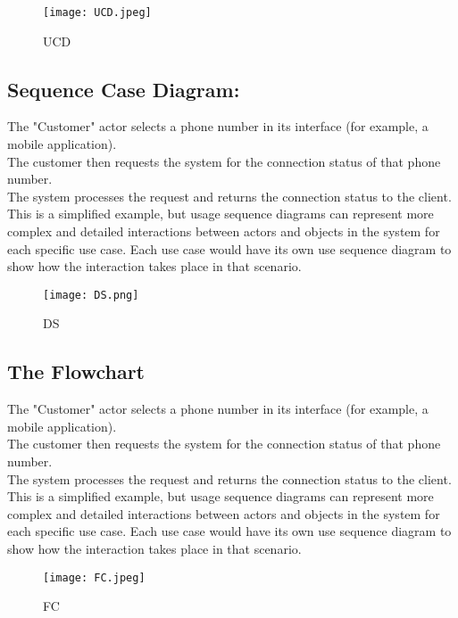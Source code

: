 \documentclass[journal]{IEEEtran}
\begin{document}
\begin{figure}[h]
    \centering
 \texttt{[image: UCD.jpeg]}
    \caption{UCD}
    \label{fig:ejemplo}
\end{figure}

\subsection{Sequence Case Diagram:}
The "Customer" actor selects a phone number in its interface (for example, a mobile application).\\
The customer then requests the system for the connection status of that phone number. \\
The system processes the request and returns the connection status to the client. \\
This is a simplified example, but usage sequence diagrams can represent more complex and detailed interactions between actors and objects in the system for each specific use case. Each use case would have its own use sequence diagram to show how the interaction takes place in that scenario.

\begin{figure}[h]
    \centering
 \texttt{[image: DS.png]}
    \caption{DS}
    \label{fig:ejemplo}
\end{figure}

\subsection{The Flowchart}
The "Customer" actor selects a phone number in its interface (for example, a mobile application). \\
The customer then requests the system for the connection status of that phone number. \\
The system processes the request and returns the connection status to the client. \\
This is a simplified example, but usage sequence diagrams can represent more complex and detailed interactions between actors and objects in the system for each specific use case. Each use case would have its own use sequence diagram to show how the interaction takes place in that scenario.

\begin{figure}[h]
    \centering
 \texttt{[image: FC.jpeg]}
    \caption{FC}
    \label{fig:ejemplo}
\end{figure}
\end{document}
